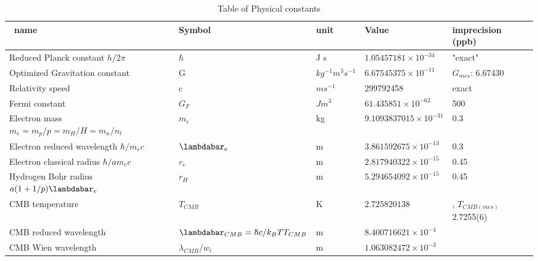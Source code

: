 \documentclass[a4paper,9pt]{article}
\newcounter{col}
\begin{document}
 
 \begin{table}
\caption[Table \ref{tab:3:table3}: Physical constants]{Table of Physical constants}
\label{tab:3:table3}
  \hskip-2.0cm\begin{tabular}{lllll}
    \toprule
    \cmidrule(r){1-5}
    \ name & Symbol  & unit  & Value & imprecision (ppb) \\
    \midrule
  
 
 Reduced Planck constant $h/2\pi$    & $\hbar$   & J s   & $1.05457181 \times 10^{-34}$ & "exact" \\
 Optimized Gravitation constant   & G & $kg^{-1} m^3 s^{-1}$  & $6.67545375\times 10^{-11}$  & \cite{Sanchez2} $G_{mes}$: 6.67430 \\
 Relativity speed     & c   & $m s^{-1}$   & 299792458 & exact \\
 Fermi constant  & $G_F$ & $J m^3$   & $61.435851 \times 10^{-62}$  &  500\\
 Electron mass $m_e = m_p/p = m_H/H = m_n/n_t$  & $m_e$ & kg  & $9.1093837015 \times 10^{-31}$  &  0.3\\
 Electron reduced wavelength $\hbar/m_ec$ & $\lambdabar_e$ &  m   & $3.861592675\times 10^{-13}$  & 0.3\\
 Electron classical radius $\hbar/am_ec$ & $r_e$ &  m   & $2.817940322\times 10^{-15}$  & 0.45\\
 Hydrogen Bohr radius $a(1+1/p)\lambdabar_e$ & $r_H$ &  m   & $5.294654092 \times 10^{-15}$  & 0.45\\
 
 
 
 
   CMB temperature & $T_{CMB}$ & K & $2.725820138$ & \cite{Sanchez2}, $T_{CMB(mes)} $ 2.7255(6)  \\
   CMB reduced wavelength & $\lambdabar_{CMB} = \hbar c/ k_B TT_{CMB} $ & m & $8.400716621 \times 10^{-4} $ & \cite{Sanchez2} \\
   CMB Wien wavelength & $\lambda_{CMB}/w_i $ & m & $1.063082472  \times 10^{-3} $ & \cite{Sanchez2} \\
   

\end{tabular}
\end{table}
\end{document}
